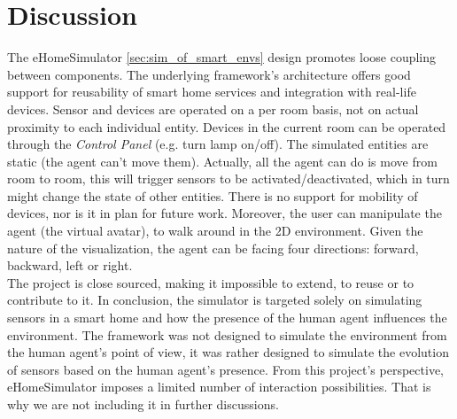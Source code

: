 \section{Discussion}\label{sec:discussions}



The eHomeSimulator \ref{sec:sim_of_smart_envs} design promotes loose coupling between components. The underlying framework's architecture offers good support for reusability of smart home services and integration with real-life devices. Sensor and devices are operated on a per room basis, not on actual proximity to each individual entity. Devices in the current room can be operated through the \emph{Control Panel} (e.g. turn lamp on/off). The simulated entities are static (the agent can't move them). Actually, all the agent can do is move from room to room, this will trigger sensors to be activated/deactivated, which in turn might change the state of other entities. There is no support for mobility of devices, nor is it in plan for future work. Moreover, the user can manipulate the agent (the virtual avatar), to walk around in the 2D environment. Given the nature of the visualization, the agent can be facing four directions: forward, backward, left or right.\\

The project is close sourced, making it impossible to extend, to reuse or to contribute to it. In conclusion, the simulator is targeted solely on simulating sensors in a smart home and how the presence of the human agent influences the environment. The framework was not designed to simulate the environment from the human agent's point of view, it was rather designed to simulate the evolution of sensors based on the human agent's presence. From this project's perspective, eHomeSimulator imposes a limited number of interaction possibilities. That is why we are not including it in further discussions.\\

